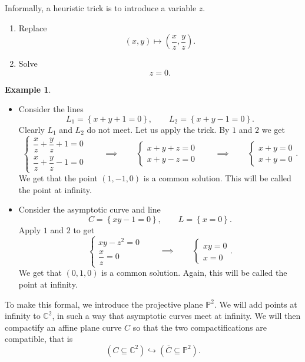 \documentclass{article}
\newcommand{\C}{\mathbb{C}}
\renewcommand{\P}{\mathbb{P}}
\newcommand{\rb}[1]{\left( #1 \right)}
\newcommand{\cb}[1]{\left\{ #1 \right\}}
\theoremstyle{definition}\newtheorem{definition}{Definition}[section]
\theoremstyle{definition}\newtheorem{notation}[definition]{Notation}
\theoremstyle{definition}\newtheorem{remark}[definition]{Remark}
\theoremstyle{definition}\newtheorem{example1}[definition]{Example}
\theoremstyle{definition}\newtheorem{fact}{Fact}
\theoremstyle{definition}\newtheorem{exercise}{Exercise}
\theoremstyle{definition}\newtheorem*{example2}{Example}
\begin{document}
Informally, a heuristic trick is to introduce a variable $ z $.
\begin{enumerate}
\item Replace
$$ \rb{x, y} \mapsto \rb{\dfrac{x}{z}, \dfrac{y}{z}}. $$
\item Solve
$$ z = 0. $$
\end{enumerate}

\begin{example1}
\hfill
\begin{itemize}
\item Consider the lines
$$ L_1 = \cb{x + y + 1 = 0}, \qquad L_2 = \cb{x + y - 1 = 0}. $$
Clearly $ L_1 $ and $ L_2 $ do not meet. Let us apply the trick. By $ 1 $ and $ 2 $ we get
$$ \begin{cases}
\dfrac{x}{z} + \dfrac{y}{z} + 1 = 0 \\
\dfrac{x}{z} + \dfrac{y}{z} - 1 = 0
\end{cases} \qquad \implies \qquad \begin{cases}
x + y + z = 0 \\
x + y - z = 0
\end{cases} \qquad \implies \qquad \begin{cases}
x + y = 0 \\
x + y = 0
\end{cases}. $$
We get that the point $ \rb{1, -1, 0} $ is a common solution. This will be called the point at infinity.
\item Consider the asymptotic curve and line
$$ C = \cb{xy - 1 = 0}, \qquad L = \cb{x = 0}. $$
Apply $ 1 $ and $ 2 $ to get
$$ \begin{cases}
xy - z^2 = 0 \\
\dfrac{x}{z} = 0
\end{cases} \qquad \implies \qquad \begin{cases}
xy = 0 \\
x = 0
\end{cases}. $$
We get that $ \rb{0, 1, 0} $ is a common solution. Again, this will be called the point at infinity.
\end{itemize}
\end{example1}

To make this formal, we introduce the projective plane $ \P^2 $. We will add points at infinity to $ \C^2 $, in such a way that asymptotic curves meet at infinity. We will then compactify an affine plane curve $ C $ so that the two compactifications are compatible, that is
$$ \rb{C \subseteq \C^2} \hookrightarrow \rb{\overline{C} \subseteq \P^2}. $$
\end{document}
